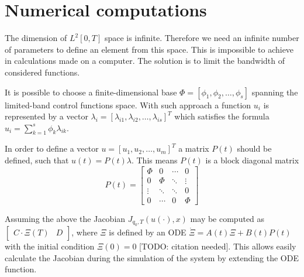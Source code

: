 \section{Numerical computations}
The dimension of $L^2[0,T]$ space is infinite. Therefore we need an infinite number of parameters to define an element from this space. This is impossible to achieve in calculations made on a computer. The solution is to limit the bandwidth of considered functions. 

It is possible to choose a finite-dimensional base $\Phi = [ \phi_1, \phi_2, \dots, \phi_s ]$ spanning the limited-band control functions space. 
With such approach a function $u_i$ is represented by a vector 
$\lambda_i = [\lambda_{i1}, \lambda_{i2}, \dots, \lambda_{is}]^T$ 
which satisfies the formula $u_i = \sum_{k=1}^s \phi_k \lambda_{ik}$.

In order to define a vector $u=[u_1, u_2, \dots, u_m]^T$ a matrix $P(t)$ should be defined, such that $u(t)=P(t)\lambda$. This means $P(t)$ is a block diagonal matrix 
\begin{equation}
P(t)=\begin{bmatrix}
\Phi & 0 & \cdots & 0\\
0 & \Phi & \ddots & \vdots\\
\vdots & \ddots & \ddots & 0 \\
0 &  \cdots & 0 & \Phi
\end{bmatrix}
\end{equation}

Assuming the above the Jacobian $J_{q_0, T}(u(\cdot), x)$ may be computed as $\begin{bmatrix}
C\cdot\Xi(T)& D
\end{bmatrix}$, where $\Xi$ is defined by an ODE $\dot \Xi = A(t)\Xi +B(t)P(t)$ with the initial condition $\Xi(0)=0$ [TODO: citation needed]. This allows easily calculate the Jacobian during the simulation of the system by extending the ODE function.
